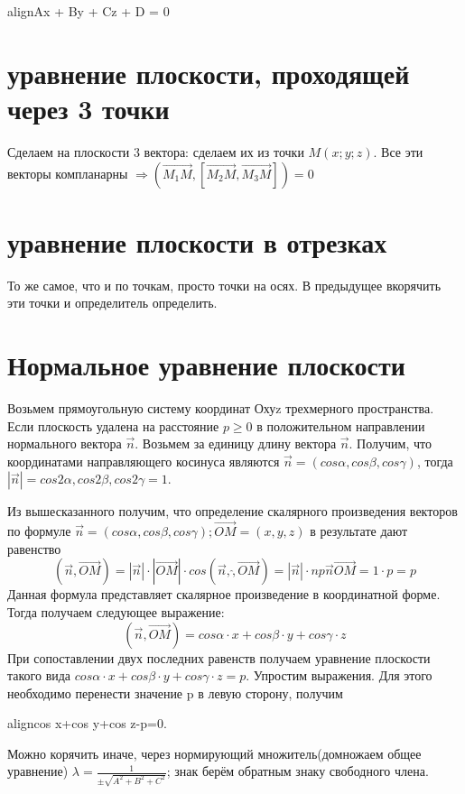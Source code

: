 \documentclass[oneside]{book}
\newcommand{\boxedeq}[2]{\begin{empheq}[box={\fboxsep=6pt\fbox}]{align}\label{#1}#2\end{empheq}}
\begin{document}
\begin{enumerate}
\begin{itemize}
\begin{enumerate}
\boxedeq{eq:*}{Ax + By + Cz + D = 0}

\section{уравнение плоскости, проходящей через 3 точки}
Сделаем на плоскости 3 вектора: сделаем их из точки $M(x;y;z)$. Все эти векторы компланарны $\Rightarrow (\vec{M_1 M}, [\vec{M_2 M}, \vec{M_3 M}]) = 0$ 

\section{уравнение плоскости в отрезках}
То же самое, что и по точкам, просто точки на осях. В предыдущее вкорячить эти точки и определитель определить.

\section{Нормальное уравнение плоскости}
Возьмем прямоугольную систему координат Охуz трехмерного пространства. Если плоскость удалена на расстояние $p\geq0$ в положительном направлении нормального вектора $\vec{n}$.  Возьмем за единицу длину вектора $\vec{n}$. Получим, что координатами направляющего косинуса являются $\vec{n}=(cos \alpha, cos \beta, cos \gamma)$,  тогда $|\vec{n}|=cos2 \alpha, cos2 \beta, cos2 \gamma=1$.

\par Из вышесказанного получим, что определение скалярного произведения векторов по формуле $\vec{n}=(cos \alpha, cos \beta, cos \gamma); \vec{OM} =(x, y, z)$ в результате дают равенство
$$
(\vec{n}, \vec{OM})=|\vec{n}|\cdot|\vec{OM}| \cdot cos (\vec{n}, \hat, \vec{OM})=|\vec{n}|\cdot np\vec{n}\vec{OM}=1\cdot p=p
$$
Данная формула представляет скалярное произведение в координатной форме. Тогда получаем следующее выражение:
$$
(\vec{n}, \vec{OM})=cos \alpha \cdot x+cos \beta \cdot y+cos \gamma \cdot z
$$
При сопоставлении двух последних равенств получаем уравнение плоскости такого вида $cos \alpha \cdot x+cos \beta \cdot y+cos \gamma \cdot z=p.$ Упростим выражения. Для этого необходимо перенести значение p в левую сторону, получим 
\boxedeq{eq:*}{cos \alpha \cdot x+cos \beta \cdot y+cos \gamma \cdot z-p=0.}
Можно корячить иначе, через нормирующий множитель(домножаем общее уравнение) $\lambda = \frac{1}{\pm \sqrt{A^2 + B^2 + C^2}}$; знак берём обратным знаку свободного члена.

\setcounter{chapter}{44}

\end{enumerate}
\end{itemize}
\end{enumerate}
\end{document}
